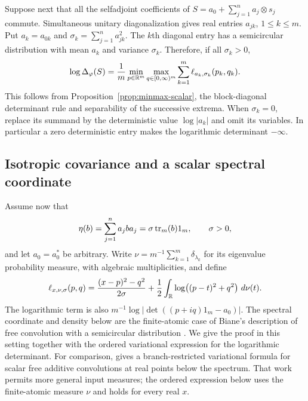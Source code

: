 Suppose next that all the selfadjoint coefficients of $S=a_0+\sum_{j=1}^n a_j\otimes s_j$ commute.
Simultaneous unitary diagonalization gives real entries $a_{jk}$, $1\le k\le m$.
Put $a_k=a_{0k}$ and $\sigma_k=\sum_{j=1}^n a_{jk}^2$.
The $k$th diagonal entry has a semicircular distribution with mean $a_k$ and variance $\sigma_k$.
Therefore, if all $\sigma_k>0$,
\begin{equation}\label{eq:minmax-commuting}
 \log\Delta_\varphi(S)
 =\frac1m\min_{p\in\mathbb R^m}\max_{q\in[0,\infty)^m}
       \sum_{k=1}^m\ell_{a_k,\sigma_k}(p_k,q_k).
\end{equation}
This follows from Proposition~\ref{prop:minmax-scalar}, the block-diagonal determinant rule and separability of the successive extrema.
When $\sigma_k=0$, replace its summand by the deterministic value $\log|a_k|$ and omit its variables.
In particular a zero deterministic entry makes the logarithmic determinant $-\infty$.

\subsection{Isotropic covariance and a scalar spectral coordinate}

Assume now that
\begin{equation}\label{eq:minmax-isotropy}
 \eta(b)=\sum_{j=1}^n a_jba_j
       =\sigma\operatorname{tr}_m(b)1_m,\qquad \sigma>0,
\end{equation}
and let $a_0=a_0^*$ be arbitrary.
Write $\nu=m^{-1}\sum_{k=1}^m\delta_{\lambda_k}$ for its eigenvalue probability measure, with algebraic multiplicities, and define
\[
 \ell_{x,\nu,\sigma}(p,q)
 =\frac{(x-p)^2-q^2}{2\sigma}
   +\frac12\int_\mathbb R\log\bigl((p-t)^2+q^2\bigr)\,\,d\nu(t).
\]
The logarithmic term is also $m^{-1}\log|\det((p+iq)1_m-a_0)|$.
The spectral coordinate and density below are the finite-atomic case of Biane's description of free convolution with a semicircular distribution \cite[Section 3, Lemma 4, Proposition 2 and Corollary 3]{Bia97}.
We give the proof in this setting together with the ordered variational expression for the logarithmic determinant.
For comparison, \cite[Theorem 1.1 and (1.6)]{BCG25} gives a branch-restricted variational formula for scalar free additive convolutions at real points below the spectrum.
That work permits more general input measures; the ordered expression below uses the finite-atomic measure $\nu$ and holds for every real $x$.

